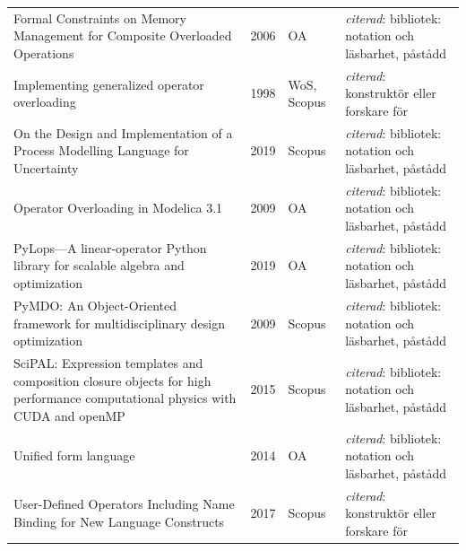 \begin{longtable}{@{}%
  >{\raggedright\arraybackslash}p{}c%
  >{\raggedright\arraybackslash}p{}%
  >{\raggedright\arraybackslash}p{}@{}}
Formal Constraints on Memory Management for Composite Overloaded Operations & 2006 & OA & \emph{citerad}: bibliotek: notation och läsbarhet, påstådd \\
Implementing generalized operator overloading & 1998 & WoS, Scopus & \emph{citerad}: konstruktör eller forskare för \\
On the Design and Implementation of a Process Modelling Language for Uncertainty & 2019 & Scopus & \emph{citerad}: bibliotek: notation och läsbarhet, påstådd \\
Operator Overloading in Modelica 3.1 & 2009 & OA & \emph{citerad}: bibliotek: notation och läsbarhet, påstådd \\
PyLops---A linear-operator Python library for scalable algebra and optimization & 2019 & OA & \emph{citerad}: bibliotek: notation och läsbarhet, påstådd \\
PyMDO: An Object-Oriented framework for multidisciplinary design optimization & 2009 & Scopus & \emph{citerad}: bibliotek: notation och läsbarhet, påstådd \\
SciPAL: Expression templates and composition closure objects for high performance computational physics with CUDA and openMP & 2015 & Scopus & \emph{citerad}: bibliotek: notation och läsbarhet, påstådd \\
Unified form language & 2014 & OA & \emph{citerad}: bibliotek: notation och läsbarhet, påstådd \\
User-Defined Operators Including Name Binding for New Language Constructs & 2017 & Scopus & \emph{citerad}: konstruktör eller forskare för \\
\end{longtable}
\endgroup
